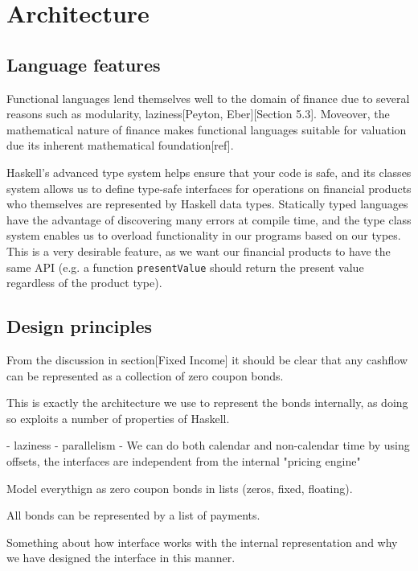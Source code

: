 \chapter{Architecture}
\section{Language features}

Functional languages lend themselves well to the domain of finance due
to several reasons such as modularity\cite{hughes:matters-cj}, laziness[Peyton, Eber][Section 5.3]. Moveover, the mathematical nature of finance makes functional languages suitable for valuation due its inherent mathematical foundation[ref].

Haskell's advanced type system helps ensure that your code is safe, and its classes system allows us to define type-safe interfaces for operations on financial products who themselves are represented by Haskell data types. 
Statically typed languages have the advantage of discovering many errors at compile time, and the type class system enables us to overload functionality in our programs based on our types. This is a very desirable feature, as we want our financial products to have the same API (e.g. a function \texttt{presentValue} should return the present value regardless of the product type).\\

\section{Design principles}


From the discussion in section[Fixed Income] it should be clear that any cashflow can be represented as a collection of zero coupon bonds.

This is exactly the architecture we use to represent the bonds internally, as doing so exploits a number of properties of Haskell.

- laziness
- parallelism
- We can do both calendar and non-calendar time by using offsets, the interfaces are independent from the internal "pricing engine"

Model everythign as zero coupon bonds in lists (zeros, fixed, floating).

All bonds can be represented by a list of payments.

Something about how interface works with the internal representation and why we have designed the interface in this manner.

